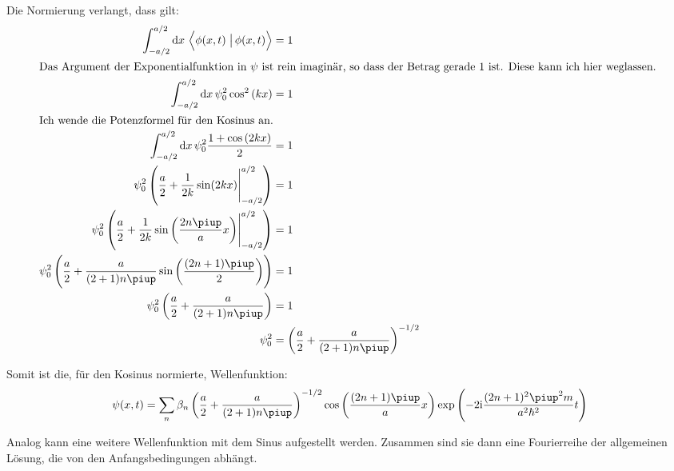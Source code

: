 Die Normierung verlangt, dass gilt:
\begin{align*}
	\int_{-a/2}^{a/2} \dif x \, \braket{\phi(x, t)}{\phi(x, t)} &= 1 \\
	\intertext{%
		Das Argument der Exponentialfunktion in $\psi$ ist rein imaginär, so
		dass der Betrag gerade 1 ist. Diese kann ich hier weglassen.
	}
	\int_{-a/2}^{a/2} \dif x \, \psi_0^2 \cos^2\del{kx} &= 1 \\
	\intertext{%
		Ich wende die Potenzformel für den Kosinus an.
	}
	\int_{-a/2}^{a/2} \dif x \, \psi_0^2 \frac{1 + \cos\del{2kx}}{2} &= 1 \\
	\psi_0^2 \del{\frac a2 + \eval{\frac{1}{2k} \sin(2kx)}_{-a/2}^{a/2}} &= 1 \\
	\psi_0^2 \del{\frac a2 + \eval{\frac{1}{2k} \sin\del{\frac{2n\piup}{a}x}}_{-a/2}^{a/2}} &= 1 \\
	\psi_0^2 \del{\frac a2 + \frac{a}{(2+1)n\piup} \sin\del{\frac{(2n+1)\piup}2}} &= 1 \\
	\psi_0^2 \del{\frac a2 + \frac{a}{(2+1)n\piup}} &= 1 \\
	\psi_0^2 &= \del{\frac a2 + \frac{a}{(2+1)n\piup}}^{-1/2}  \\
\end{align*}

Somit ist die, für den Kosinus normierte, Wellenfunktion:
\[
	\psi(x, t) =
	\sum_n \beta_n
	\del{\frac a2 + \frac{a}{(2+1)n\piup}}^{-1/2}
	\cos\del{\frac{(2n+1)\piup}{a} x}
	\exp\del{- 2 \ii \frac{(2n+1)^2\piup^2 m}{a^2\hbar^2} t}
\]

Analog kann eine weitere Wellenfunktion mit dem Sinus aufgestellt werden.
Zusammen sind sie dann eine Fourierreihe der allgemeinen Lösung, die von den
Anfangsbedingungen abhängt.


\IfFileExists{\bibliographyfile}{
	
}{}



